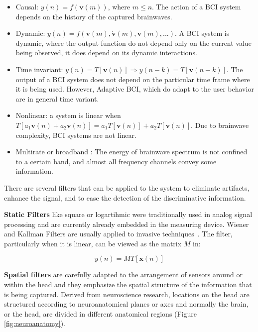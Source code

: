 \begin{itemize}
\item Causal:  $ y(n) = f( \mathbf{v}(m) ) $, where $ m \leq n $.  The action of a BCI system depends on the history of the captured brainwaves.
\item Dynamic: $ y(n) = f( \mathbf{v}(m),  \mathbf{\dot{v}}(m),\mathbf{\ddot{v}}(m),...) $.  A BCI system is dynamic, where the output function do not depend only on the current value being observed, it does depend on its dynamic interactions.
\item Time invariant: $ y(n) = T\left[ \mathbf{v}(n) \right] \Rightarrow y(n-k) = T\left[ \mathbf{v}(n-k) \right] $.  The output of a BCI system does not depend on the particular time frame where it is being used.  However, Adaptive BCI, which do adapt to the user behavior are in general time variant.
\item Nonlinear: a system is linear when $T\left[ a_1 \mathbf{v}(n) + a_2 \mathbf{v}(n) \right]  = a_1 T \left[ \mathbf{v}(n) \right] + a_2 T \left[ \mathbf{v}(n) \right] $. Due to brainwave complexity, BCI systems are not linear.
\item Multirate or broadband \cite{Miller2010}:  The energy of brainwave spectrum is not confined to a certain band, and almost all frequency channels convey some information.
\end{itemize}

There are several filters that can be applied to the system to eliminate artifacts, enhance the signal, and to ease the detection of the discriminative information.

\textbf{Static Filters} like square or logartihmic were traditionally used in analog signal processing and are currently already embedded in the measuring device.  Wiener and Kallman Filters are usually applied to invasive techniques~\cite{NeuralEngineeringBookBinHe}.  The filter, particularly when it is linear, can be viewed as the matrix $M$ in:

\begin{equation}
y(n) = M T\left[\mathbf{x}(n)\right]
\label{eq:filters}
\end{equation}

\textbf{Spatial filters} are carefully adapted to the arrangement of sensors around or within the head and they emphasize the spatial structure of the information that is being captured. Derived from neuroscience research, locations on the head are structured according to neuroanatomical planes or axes and normally the brain, or the head, are divided in different anatomical regions (Figure \ref{fig:neuroanatomy}).   

